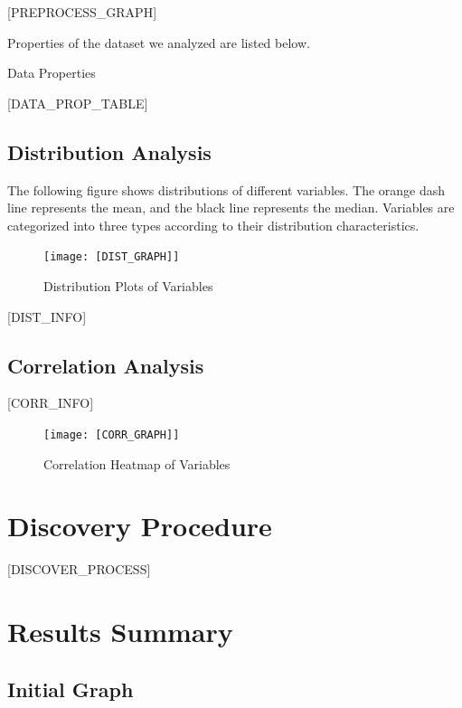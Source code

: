 \documentclass{article}
\begin{document}
[PREPROCESS_GRAPH]

Properties of the dataset we analyzed are listed below.

\begin{table}[H]
    \centering
    \caption{Data Properties}
[DATA_PROP_TABLE]
\end{table}


\subsection{Distribution Analysis}
The following figure shows distributions of different variables. The orange dash line represents the mean, 
and the black line represents the median. Variables are categorized into three types according to their distribution characteristics.

\begin{figure}[H]
\centering
\texttt{[image: [DIST\_GRAPH]]}
\caption{\label{fig:dist}Distribution Plots of Variables}
\end{figure}

[DIST_INFO]

\subsection{Correlation Analysis}

\begin{minipage}[t]{0.5\linewidth}
    [CORR_INFO]
\vfill
\end{minipage}
\hfill
\begin{minipage}[t]{0.5\linewidth}
    \begin{figure}[H]
        \centering
        \vspace{-1.5cm}
        \texttt{[image: [CORR\_GRAPH]]}
        \caption{\label{fig:corr}Correlation Heatmap of Variables}
    \end{figure}
\end{minipage}

\section{Discovery Procedure}
[DISCOVER_PROCESS]

\section{Results Summary}

\subsection{Initial Graph}
\end{document}
